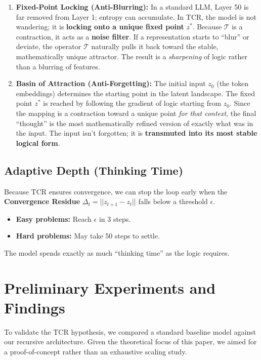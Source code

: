 \documentclass[11pt, a4paper]{article}
\begin{document}
\begin{enumerate}
    \item \textbf{Fixed-Point Locking (Anti-Blurring):} 
    In a standard LLM, Layer 50 is far removed from Layer 1; entropy can accumulate. In TCR, the model is not wandering; it is \textbf{locking onto a unique fixed point} $z^*$. Because $\mathcal{T}$ is a contraction, it acts as a \textbf{noise filter}. If a representation starts to ``blur'' or deviate, the operator $\mathcal{T}$ naturally pulls it back toward the stable, mathematically unique attractor. The result is a \textit{sharpening} of logic rather than a blurring of features.

    \item \textbf{Basin of Attraction (Anti-Forgetting):} 
    The initial input $z_0$ (the token embeddings) determines the starting point in the latent landscape. The fixed point $z^*$ is reached by following the gradient of logic starting from $z_0$. Since the mapping is a contraction toward a unique point \textit{for that context}, the final ``thought'' is the most mathematically refined version of exactly what was in the input. The input isn't forgotten; it is \textbf{transmuted into its most stable logical form}.
\end{enumerate}

\subsection{Adaptive Depth (Thinking Time)}
Because TCR ensures convergence, we can stop the loop early when the \textbf{Convergence Residue} $\Delta_t = ||z_{t+1} - z_t||$ falls below a threshold $\epsilon$. 
\begin{itemize}
    \item \textbf{Easy problems:} Reach $\epsilon$ in 3 steps.
    \item \textbf{Hard problems:} May take 50 steps to settle. 
\end{itemize}
The model spends exactly as much ``thinking time'' as the logic requires.

\section{Preliminary Experiments and Findings}

To validate the TCR hypothesis, we compared a standard baseline model against our recursive architecture. Given the theoretical focus of this paper, we aimed for a proof-of-concept rather than an exhaustive scaling study.
\end{document}
